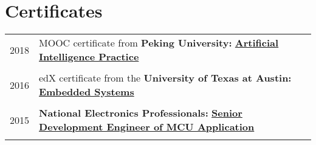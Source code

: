 \documentclass[a4paper,10pt]{article} %
\begin{document}
\section{Certificates}
\begin{tabular}{r|l}	


2018                        & MOOC certificate from \textbf{Peking University:} \href{https://nbviewer.org/github/HuangJiaLian/DataBase0/blob/edd29a7b30885820fabc6720dac9bd56c0cb9851/uPic/2021_11_26_10_Peking_AI.png}{\textbf{Artificial Intelligence Practice}}\\
\multicolumn{2}{c}{} \\	%

2016                        & edX certificate from the \textbf{University of Texas at Austin:} \href{https://nbviewer.org/github/HuangJiaLian/DataBase0/blob/37d6fc3eadd7a5276f030f00b0a618de66df0e78/uPic/2021_11_26_09_UTAustinX_UT.6.03x_Certificate_edX.pdf}{\textbf{Embedded Systems} }\\   	
\multicolumn{2}{c}{} \\	%

2015                     & 
\textbf{National Electronics Professionals:}  \href{https://nbviewer.org/github/HuangJiaLian/DataBase0/blob/f0bbfb6e2f2189b6ae0c43100579b9605faed6a6/uPic/2021_11_26_12_8.png}{\textbf{Senior Development Engineer of MCU Application}}\\
\multicolumn{2}{c}{} \\	%



\end{tabular}
\end{document}
